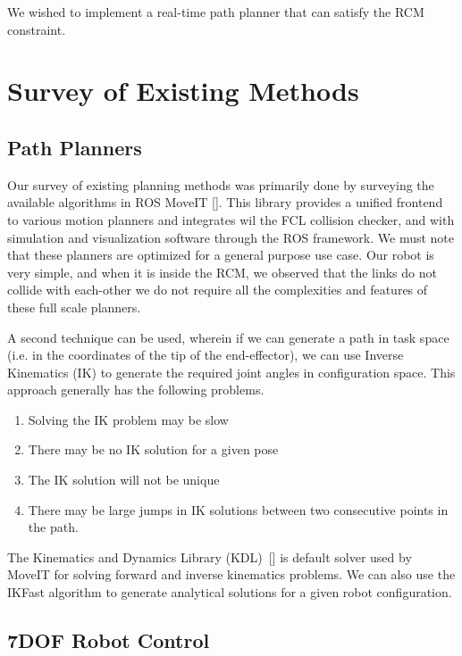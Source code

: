 \documentclass[BTech]{iitmdiss}
\begin{document}
    We wished to implement a real-time path planner that can satisfy the RCM constraint.


    \section{Survey of Existing Methods}

    \subsection{Path Planners}
    Our survey of existing planning methods was primarily done by surveying the available algorithms in ROS MoveIT [\cite{Coleman_Sucan_Chitta_Correll_2014}].
    This library provides a unified frontend to various motion planners and integrates wil the FCL collision checker, and with simulation and visualization software through the ROS framework.
    We must note that these planners are optimized for a general purpose use case.
    Our robot is very simple, and when it is inside the RCM, we observed that the links do not collide with each-other we do not require all the complexities and features of these full scale planners.

    A second technique can be used, wherein if we can generate a path in task space (i.e. in the coordinates of the tip of the end-effector),
    we can use Inverse Kinematics (IK) to generate the required joint angles in configuration space. This approach generally has the following problems.
    \begin{enumerate}
        \item Solving the IK problem may be slow
        \item There may be no IK solution for a given pose
        \item The IK solution will not be unique
        \item There may be large jumps in IK solutions between two consecutive points in the path.
    \end{enumerate}

    The Kinematics and Dynamics Library (KDL)~[\cite{kdl-url}] is default solver used by MoveIT for solving forward and inverse kinematics problems.
    We can also use the IKFast algorithm to generate analytical solutions for a given robot configuration.

    \subsection{7DOF Robot Control}
\end{document}
